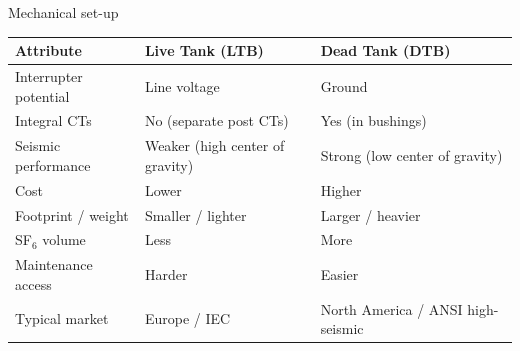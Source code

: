 \begin{frame}{Mechanical set-up}
  \begin{table}[h]
  \centering
  \label{tab:ltb-vs-dtb}
  \begin{tabular}{p{} p{} p{}}
  \hline
  \textbf{Attribute} & \textbf{Live Tank (LTB)} & \textbf{Dead Tank (DTB)} \\
  \hline
  Interrupter potential & Line voltage & Ground \\
  Integral CTs & No (separate post CTs) & Yes (in bushings) \\
  Seismic performance & Weaker \newline (high center of gravity) & Strong \newline (low center of gravity) \\
  Cost & Lower & Higher \\
  Footprint / weight & Smaller / lighter & Larger / heavier \\
  SF$_6$ volume & Less & More \\
  Maintenance access & Harder & Easier \\
  Typical market & Europe / IEC & North America / ANSI \newline high-seismic \\
  \hline
  \end{tabular}
  \end{table}
\end{frame}